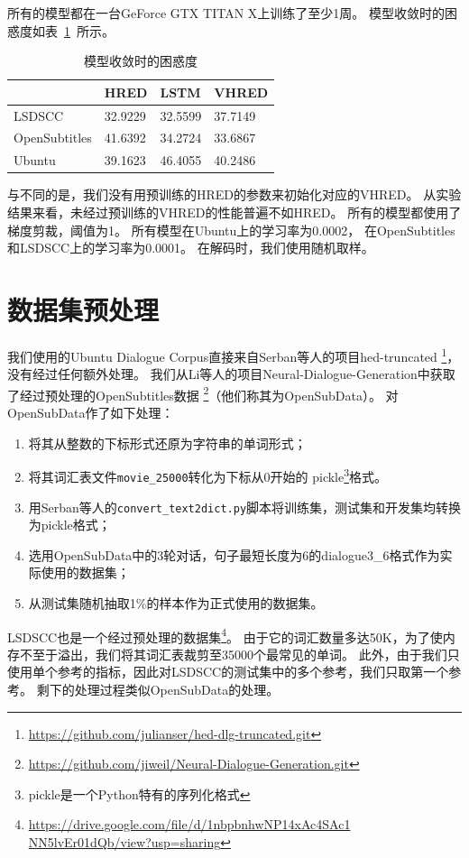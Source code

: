 所有的模型都在一台GeForce GTX TITAN X上训练了至少1周。
模型收敛时的困惑度如表~\ref{tab:converged_perplexity}~所示。
\begin{table}[H]
    \centering
    \caption{模型收敛时的困惑度}
    \label{tab:converged_perplexity}
    \begin{tabular}{llll}
        \toprule
        & HRED & LSTM & VHRED \\
        \midrule
        LSDSCC & 32.9229 & 32.5599 & 37.7149 \\
        OpenSubtitles & 41.6392 & 34.2724 & 33.6867 \\
        Ubuntu & 39.1623 & 46.4055 & 40.2486 \\
        \bottomrule
    \end{tabular}
\end{table}

与\cite{VHRED}不同的是，我们没有用预训练的HRED的参数来初始化对应的VHRED。
从实验结果来看，未经过预训练的VHRED的性能普遍不如HRED。
所有的模型都使用了梯度剪裁，阈值为1。
所有模型在Ubuntu上的学习率为0.0002，
在OpenSubtitles和LSDSCC上的学习率为0.0001。
在解码时，我们使用随机取样。

\section{数据集预处理}
\label{sec:dataset_proprecessing}
我们使用的Ubuntu Dialogue Corpus直接来自Serban等人的项目hed-truncated
\footnote{\url{https://github.com/julianser/hed-dlg-truncated.git}}，没有经过任何额外处理。
我们从Li等人的项目Neural-Dialogue-Generation中获取了经过预处理的OpenSubtitles数据
\footnote{\url{https://github.com/jiweil/Neural-Dialogue-Generation.git}}（他们称其为OpenSubData）。
对OpenSubData作了如下处理：
\begin{enumerate}
    \item 将其从整数的下标形式还原为字符串的单词形式；
    \item 将其词汇表文件\texttt{movie\_25000}转化为下标从0开始的
    pickle\footnote{pickle是一个Python特有的序列化格式}格式。
    \item 用Serban等人的\texttt{convert\_text2dict.py}脚本将训练集，测试集和开发集均转换为pickle格式；
    \item 选用OpenSubData中的3轮对话，句子最短长度为6的dialogue3\_6格式作为实际使用的数据集；
    \item 从测试集随机抽取1\%的样本作为正式使用的数据集。
\end{enumerate}

LSDSCC也是一个经过预处理的数据集\footnote{\url{https://drive.google.com/file/d/1nbpbnhwNP14xAc4SAc1 NN5lvEr01dQb/view?usp=sharing}}。
由于它的词汇数量多达50K，为了使内存不至于溢出，我们将其词汇表裁剪至35000个最常见的单词。
此外，由于我们只使用单个参考的指标，因此对LSDSCC的测试集中的多个参考，我们只取第一个参考。
剩下的处理过程类似OpenSubData的处理。

